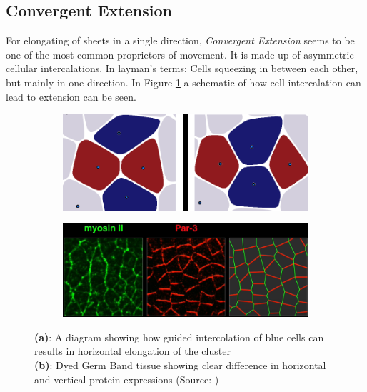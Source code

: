 \subsection{Convergent Extension}
\label{sec:ConvergentExtension}
For elongating of sheets in a single direction, \textit{Convergent Extension} seems to be one of the most common proprietors of movement. It is made up of asymmetric cellular intercalations. In layman's terms: Cells squeezing in between each other, but mainly in one direction. 
In Figure  \ref{fig:cellIntercolation} a schematic of how cell intercalation can lead to extension can be seen.
\begin{figure}[H]
    \centering
    \begin{subfigure}{0.45\linewidth}
        \centering
    \includegraphics[width=\linewidth]{chapters/Theory/figures/ConvergentExtensionDiagram.png}
    \caption{}
    \label{fig:cellIntercolation}
    \end{subfigure}
        \begin{subfigure}{0.45\linewidth}
        \centering
    \includegraphics[width=\linewidth]{chapters/Theory/figures/bipolar-PCP.png}
        \caption{}
    \label{fig:dyedDifferentialWall}
    \end{subfigure}
    \caption{\textbf{(a)}: A diagram showing how guided intercolation of blue cells can results in horizontal elongation of the cluster \\\textbf{(b)}: Dyed Germ Band tissue showing clear difference in horizontal and vertical protein expressions (Source: )}
    
    \label{fig:ConvergentExtensionDiagram}
\end{figure}

